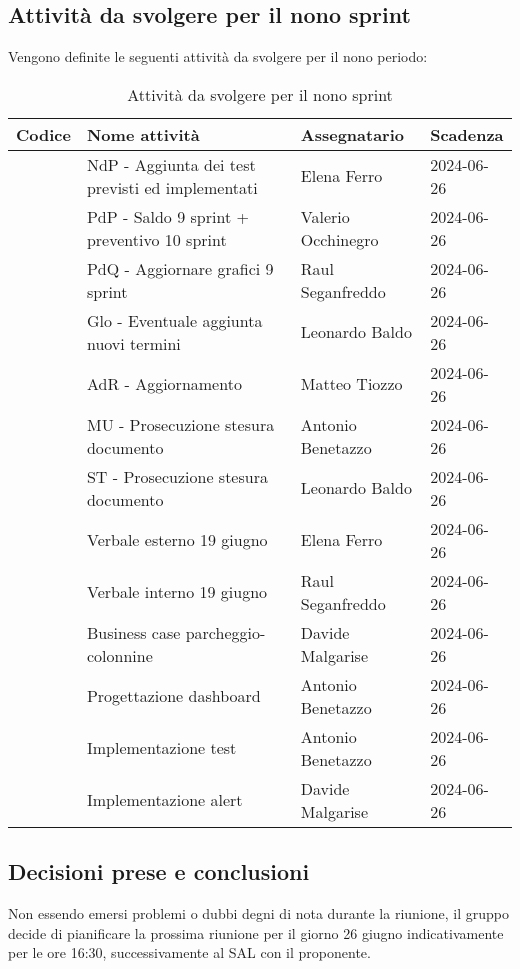 \documentclass[italian,12pt]{article}
\begin{document}
\subsection{Attività da svolgere per il nono sprint}
Vengono definite le seguenti attività da svolgere per il nono periodo:
\begin{table}[!h]
	\centering
	\begin{tabular}{ |l||l|l|l| }
		\hline
		\textbf{Codice}          & \textbf{Nome attività}                           & \textbf{Assegnatario} & \textbf{Scadenza} \\
		\hline
		\mySkip[86bz8e28m]       & NdP - Aggiunta dei test previsti ed implementati & Elena Ferro           & 2024-06-26        \\
		\mySkip[86bz8e6cp]       & PdP - Saldo 9 sprint + preventivo 10 sprint      & Valerio Occhinegro    & 2024-06-26        \\
		\mySkip[86bz8e4ac]       & PdQ - Aggiornare grafici 9 sprint                & Raul Seganfreddo      & 2024-06-26        \\
		\mySkip[86bz8e8g5]       & Glo - Eventuale aggiunta nuovi termini           & Leonardo Baldo        & 2024-06-26        \\
		\mySkip[86bz8e13d]       & AdR - Aggiornamento                              & Matteo Tiozzo         & 2024-06-26        \\
		\mySkip[86bz8e2ja]       & MU - Prosecuzione stesura documento              & Antonio Benetazzo     & 2024-06-26        \\
		\mySkip[86bz8e3xn]       & ST - Prosecuzione stesura documento              & Leonardo Baldo        & 2024-06-26        \\
		\mySkip[86bz9gj8r]       & Verbale esterno 19 giugno                        & Elena Ferro           & 2024-06-26        \\
		\mySkip[86bz9gjd9]       & Verbale interno 19 giugno                        & Raul Seganfreddo      & 2024-06-26        \\
		\mySkip[86bz8dzy0]       & Business case parcheggio-colonnine               & Davide Malgarise      & 2024-06-26        \\
		\mySkip[86bz8dzz7]       & Progettazione dashboard                          & Antonio Benetazzo     & 2024-06-26        \\
		\mySkip[86bz8dzzg]       & Implementazione test                             & Antonio Benetazzo     & 2024-06-26        \\
		\mySkip[86bz8e010]       & Implementazione alert                            & Davide Malgarise      & 2024-06-26        \\
		\hline
	\end{tabular}
	\caption{Attività da svolgere per il nono sprint}
\end{table}

\subsection{Decisioni prese e conclusioni}
Non essendo emersi problemi o dubbi degni di nota durante la riunione, il gruppo decide di pianificare la prossima riunione per il giorno 26 giugno indicativamente per le ore 16:30, successivamente al SAL con il proponente.
\end{document}
